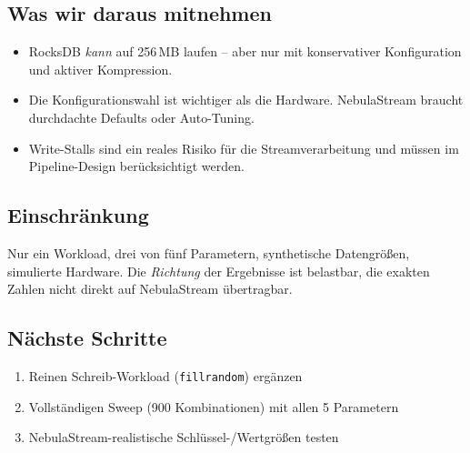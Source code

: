 \documentclass[11pt,a4paper]{scrartcl}
\begin{document}
\subsection*{Was wir daraus mitnehmen}

\begin{itemize}[nosep]
  \item RocksDB \emph{kann} auf 256\,MB laufen -- aber nur mit konservativer
        Konfiguration und aktiver Kompression.
  \item Die Konfigurationswahl ist wichtiger als die Hardware. NebulaStream
        braucht durchdachte Defaults oder Auto-Tuning.
  \item Write-Stalls sind ein reales Risiko für die Streamverarbeitung und
        müssen im Pipeline-Design berücksichtigt werden.
\end{itemize}

\subsection*{Einschränkung}

Nur ein Workload, drei von fünf Parametern, synthetische Datengrößen,
simulierte Hardware. Die \emph{Richtung} der Ergebnisse ist belastbar, die
exakten Zahlen nicht direkt auf NebulaStream übertragbar.

\subsection*{Nächste Schritte}

\begin{enumerate}[nosep]
  \item Reinen Schreib-Workload (\texttt{fillrandom}) ergänzen
  \item Vollständigen Sweep (900 Kombinationen) mit allen 5 Parametern
  \item NebulaStream-realistische Schlüssel-/Wertgrößen testen
\end{enumerate}
\end{document}
